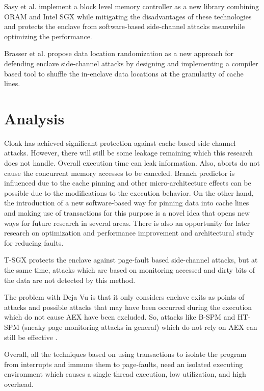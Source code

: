 Sasy et al. \cite{zerotrace} implement a block level memory controller as a new library combining ORAM \cite{oram1,oram2,oram3} and Intel SGX while mitigating the disadvantages of these technologies and protects the enclave from software-based side-channel attacks meanwhile optimizing the performance.

Brasser et al. \cite{drsgx} propose data location randomization as a new approach for defending enclave side-channel attacks by designing and implementing a compiler based tool to shuffle the in-enclave data locations at the granularity of cache lines.

\section{Analysis}
Cloak \cite{cloak} has achieved significant protection against cache-based side-channel attacks. However, there will still be some leakage remaining which this research does not handle. Overall execution time can leak information. Also, aborts do not cause the concurrent memory accesses to be canceled. Branch predictor is influenced due to the cache pinning and other micro-architecture effects can be possible due to the modifications to the execution behavior. On the other hand, the introduction of a new software-based way for pinning data into cache lines and making use of transactions for this purpose is a novel idea that opens new ways for future research in several areas. There is also an opportunity for later research on optimization and performance improvement and architectural study for reducing faults.

T-SGX \cite{tsgx} protects the enclave against page-fault based side-channel attacks, but at the same time, attacks which are based on monitoring accessed and dirty bits of the data are not detected by this method.

The problem with Deja Vu \cite{dejavu} is that it only considers enclave exits as points of attacks and possible attacks that may have been occurred during the execution which do not cause AEX have been excluded. So, attacks like B-SPM and HT-SPM (sneaky page monitoring attacks in general) which do not rely on AEX can still be effective \cite{leakycauldron}.

Overall, all the techniques based on using transactions to isolate the program from interrupts and immune them to page-faults, need an isolated executing environment which causes a single thread execution, low utilization, and high overhead.

